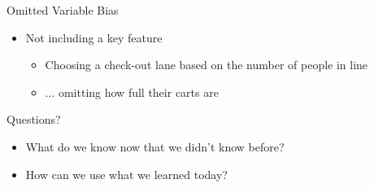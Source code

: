\documentclass[aspectratio=169]{beamer}
\begin{document}
\begin{frame}{Omitted Variable Bias}
\begin{itemize}
	\item Not including a key feature
	\begin{itemize}
	\item Choosing a check-out lane based on the number of people in line
	\item ... omitting how full their carts are
	\end{itemize}
\end{itemize}
\end{frame}
\begin{frame}{Questions?}
\begin{itemize}
	\item What do we know now that we didn't know before?
	\vspace{5 em}
	\item How can we use what we learned today?
\end{itemize}
\end{frame}


\end{document}
